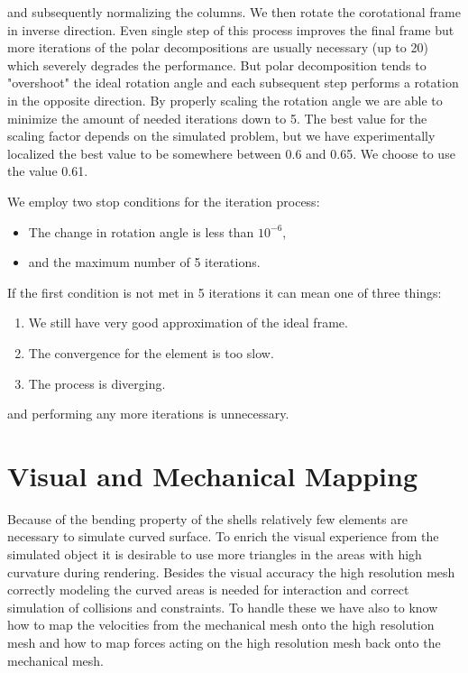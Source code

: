 \documentclass{egpubl}
\begin{document}
\noindent
and subsequently normalizing the columns. We then rotate the corotational
frame in inverse direction. Even single step of this process improves the
final frame but more iterations of the polar decompositions are usually
necessary (up to 20) which severely degrades the performance. But polar
decomposition tends to "overshoot" the ideal rotation angle and each
subsequent step performs a rotation in the opposite direction. By properly
scaling the rotation angle we are able to minimize the amount of needed
iterations down to 5. The best value for the scaling factor depends on the
simulated problem, but we have experimentally localized the best value to
be somewhere between 0.6 and 0.65. We choose to use the value 0.61.

We employ two stop conditions for the iteration process:
\begin{itemize}
    \item The change in rotation angle is less than $10^{-6}$,
    \item and the maximum number of 5 iterations.
\end{itemize}

If the first condition is not met in 5 iterations it can mean one of three
things:

\begin{enumerate}
    \item We still have very good approximation of the ideal frame.
    \item The convergence for the element is too slow.
    \item The process is diverging.
\end{enumerate}

\noindent
and performing any more iterations is unnecessary.





\section{Visual and Mechanical Mapping} %

Because of the bending property of the shells relatively few elements are
necessary to simulate curved surface. To enrich the visual experience from
the simulated object it is desirable to use more triangles in the areas
with high curvature during rendering. Besides the visual accuracy the high
resolution mesh correctly modeling the curved areas is needed for
interaction and correct simulation of collisions and constraints. To handle
these we have also to know how to map the velocities from the mechanical
mesh onto the high resolution mesh and how to map forces acting on the high
resolution mesh back onto the mechanical mesh.
\end{document}
